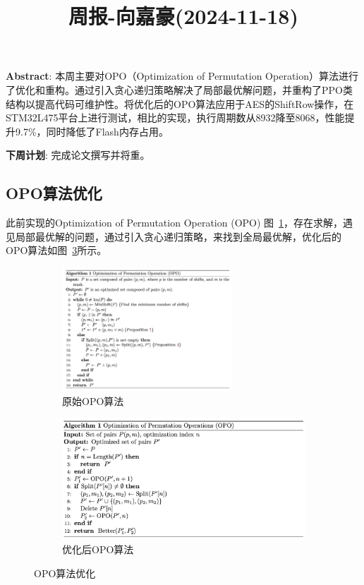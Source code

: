 \documentclass[11pt,a4paper]{article}
\title{周报-向嘉豪(2024-11-18)}
\renewcommand{\maketitle}{
  \begin{center}
    \LARGE\bfseries\thetitle
  \end{center}
}
\begin{document}
\maketitle


\noindent \textbf{Abstract}: 本周主要对OPO（Optimization of Permutation Operation）算法进行了优化和重构。通过引入贪心递归策略解决了局部最优解问题，并重构了PPO类结构以提高代码可维护性。将优化后的OPO算法应用于AES的ShiftRow操作，在STM32L475平台上进行测试，相比\cite{Schwabe2016}的实现，执行周期数从8932降至8068，性能提升9.7\%，同时降低了Flash内存占用。

\noindent \textbf{下周计划}: 完成论文撰写并将重。

\subsection{OPO算法优化}
此前实现的Optimization of Permutation Operation (OPO) 图~\ref{fig:old_opo}，存在求解，遇见局部最优解的问题，通过引入贪心递归策略，来找到全局最优解，优化后的OPO算法如图~\ref{fig:new_opo}所示。

\begin{figure}[h]
  \centering
  \begin{subfigure}[b]{0.48\textwidth}
    \includegraphics[width=0.7\textwidth]{./fig/old_opo.png}
    \caption{原始OPO算法}
    \label{fig:old_opo}
  \end{subfigure}
  \begin{subfigure}[b]{0.48\textwidth}
    \includegraphics[width=\textwidth]{./fig/new_opo.png}
    \caption{优化后OPO算法}
    \label{fig:new_opo}
  \end{subfigure}
  \caption{OPO算法优化}
\end{figure}
\end{document}
